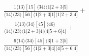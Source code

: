 \documentclass[varwidth, border=5pt]{standalone}
\begin{document}
\begin{my}
$\begin{gathered}
\scriptscriptstyle\frac{1⟨13⟩[15]⟨34⟩⟨1|2+3|5]}{⟨14⟩⟨23⟩[56]⟨1|2+3|1]⟨1|2+3|4]}+\\
\scriptscriptstyle\frac{1⟨13⟩⟨34⟩[45]⟨46⟩}{⟨14⟩⟨23⟩⟨1|2+3|4]⟨4|5+6|4]}+\\
\scriptscriptstyle\frac{6⟨14⟩⟨34⟩[45]⟨3|1+2|5]}{⟨14⟩⟨23⟩[56]⟨1|2+3|4]⟨4|5+6|4]}\phantom{+}
\end{gathered}$
\end{my}
\end{document}
